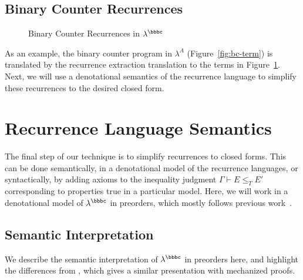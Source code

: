 \subsection{Binary Counter Recurrences}

\begin{figure}
  
  \vspace{-0.25in}
  \caption{Binary Counter Recurrences in $\lambda^\bbbc$}
  \label{fig:bc-rec}
\end{figure}

As an example, the binary counter program in $\lambda^A$
(Figure~\ref{fig:bc-term}) is translated by the recurrence extraction
translation to the terms in Figure~\ref{fig:bc-rec}.
Next, we will use a denotational semantics of the recurrence language to
simplify these recurrences to the desired closed form.

\section{Recurrence Language Semantics} \label{sec:preorder}

The final step of our technique is to simplify recurrences to closed
forms.  This can be done semantically, in a denotational model of the
recurrence languages, or syntactically, by adding axioms to the
inequality judgment $\Gamma \vdash E \le_T E'$ corresponding to
properties true in a particular model.  Here, we will work in a
denotational model of $\lambda^\bbbc$ in preorders, which mostly follows
previous work~\cite{danner-et-al:plpv13,danner-et-al:icfp15,hudson}.

\subsection{Semantic Interpretation}

We describe the semantic interpretation of $\lambda^\bbbc$ in preorders
here, and highlight the differences from \cite{hudson}, which gives a
similar presentation with mechanized proofs.

